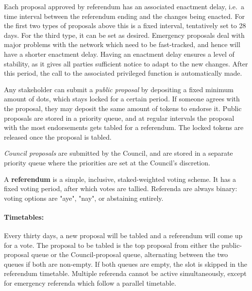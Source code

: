Each proposal approved by referendum has an associated enactment delay, i.e.~a time interval between the referendum ending and the changes being enacted. For the first two types of proposals above this is a fixed interval, tentatively set to 28 days. For the third type, it can be set as desired. Emergency proposals deal with major problems with the network which need to be fast-tracked, and hence will have a shorter enactment delay. Having an enactment delay ensures a level of stability, as it gives all parties sufficient notice to adapt to the new changes. After this period, the call to the associated privileged function is automatically made.  

Any stakeholder can submit a \emph{public proposal} by depositing a fixed minimum amount of dots, which stays locked for a certain period. If someone agrees with the proposal, they may deposit the same amount of tokens to endorse it. Public proposals are stored in a priority queue, and at regular intervals the proposal with the most endorsements gets tabled for a referendum. The locked tokens are released once the proposal is tabled.

\emph{Council proposals} are submitted by the Council, and are stored in a separate priority queue where the priorities are set at the Council's discretion.


A \textbf{referendum} is a simple, inclusive, staked-weighted voting scheme. It has a fixed voting period, after which votes are tallied. Referenda are always binary: voting options are "aye", "nay", or abstaining entirely.

\paragraph{Timetables:} Every thirty days, a new proposal will be tabled and a referendum will come up for a vote. The proposal to be tabled is the top proposal from either the public-proposal queue or the Council-proposal queue, alternating between the two queues if both are non-empty. If both queues are empty, the slot is skipped in the referendum timetable. Multiple referenda cannot be active simultaneously, except for emergency referenda which follow a parallel timetable.

